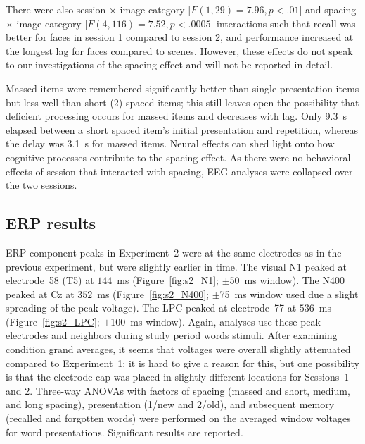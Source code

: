 There were also session $\times$ image category [$F(1,29)=7.96, p<.01$] and spacing $\times$ image category [$F(4,116)=7.52, p<.0005$] interactions such that recall was better for faces in session 1 compared to session 2, and performance increased at the longest lag for faces compared to scenes.  However, these effects do not speak to our investigations of the spacing effect and will not be reported in detail.

Massed items were remembered significantly better than single-presentation items but less well than short (2) spaced items; this still leaves open the possibility that deficient processing occurs for massed items and decreases with lag.  Only 9.3~s elapsed between a short spaced item's initial presentation and repetition, whereas the delay was 3.1~s for massed items.  Neural effects can shed light onto how cognitive processes contribute to the spacing effect.  As there were no behavioral effects of session that interacted with spacing, EEG analyses were collapsed over the two sessions.

\subsection{ERP results}

ERP component peaks in Experiment~2 were at the same electrodes as in the previous experiment, but were slightly earlier in time.
The visual N1 peaked at electrode~58 (T5) at $144$~ms (Figure~\ref{fig:s2_N1}; $\pm$50~ms window).  The N400 peaked at Cz at $352$~ms (Figure~\ref{fig:s2_N400}; $\pm$75~ms window used due a slight spreading of the peak voltage).  The LPC peaked at electrode~77 at $536$~ms (Figure~\ref{fig:s2_LPC}; $\pm$100~ms window).  Again, analyses use these peak electrodes and neighbors during study period words stimuli.  After examining condition grand averages, it seems that voltages were overall slightly attenuated compared to Experiment~1; it is hard to give a reason for this, but one possibility is that the electrode cap was placed in slightly different locations for Sessions~1 and 2.
Three-way ANOVAs with factors of spacing (massed and short, medium, and long spacing), presentation (1/new and 2/old), and subsequent memory (recalled and forgotten words) were performed on the averaged window voltages for word presentations.  Significant results are reported.

